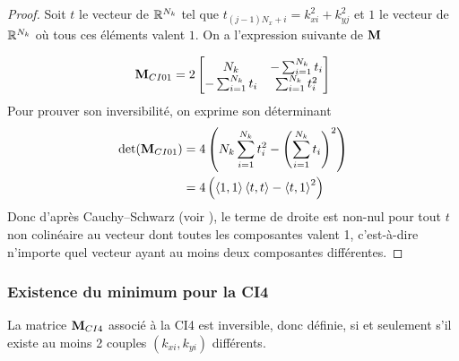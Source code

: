      \begin{proof}
        Soit \(t\) le vecteur de \(\mathbb R^{N_{k}}\) tel que \(t_{(j-1)N_x+i} = k_{xi}^2 + k_{yj}^2\) et \(1\) le vecteur de \(\mathbb R^{N_{k}}\) où tous ces éléments valent \(1\). On a l'expression suivante de \({\mathbf{M}}\)

        \begin{equation*}
          {\mathbf{M}}_{CI01} = 2\begin{bmatrix}
          N_{k} & -\sum_{i=1}^{N_{k}} t_i
          \\
          -\sum_{i=1}^{N_{k}} t_i & \sum_{i=1}^{N_{k}} t_i^2
          \end{bmatrix}
        \end{equation*}
        Pour prouver son inversibilité, on exprime son déterminant 
        \begin{align*}
          \det( {\mathbf{M}}_{CI01}) &= 4\left(N_{k}\sum_{i=1}^{N_{k}} t_i^2 - \left( \sum_{i=1}^{N_{k}} t_i\right)^2\right)
          \\
           &= 4\left( \left<{1},{1}\right>\left<{t},{t}\right> - \left<{t},{1}\right>^2\right)
        \end{align*}
        Donc d'après Cauchy–Schwarz (voir \cite[\href{https://dlmf.nist.gov/1.7\#E1}{eq.~1.7.1}]{dlmf_nist_2019}), le terme de droite est non-nul pour tout \(t\) non colinéaire au vecteur dont toutes les composantes valent 1, c'est-à-dire n'importe quel vecteur ayant au moins deux composantes différentes.
      \end{proof}

    \subsubsection{Existence du minimum pour la CI4}

      \begin{prop}
        La matrice \({\mathbf{M}}_{CI4}\) associé à la CI4 est inversible, donc définie, si et seulement s'il existe au moins 2 couples \((k_{xi},k_{yi})\) différents.
      \end{prop}

